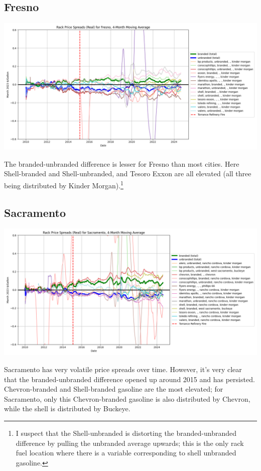 \documentclass{article}
\begin{document}
\subsection{Fresno}
\centering \includegraphics[width=5.5in]{fresno_spread.png}\\
\raggedright The branded-unbranded difference is lesser for Fresno than most cities. Here Shell-branded and Shell-unbranded, and Tesoro Exxon are all elevated (all three being distributed by Kinder Morgan).\footnote{I suspect that the Shell-unbranded is distorting the branded-unbranded difference by pulling the unbranded average upwards; this is the only rack fuel location where there is a variable corresponding to shell unbranded gasoline.}

\subsection{Sacramento} 
\centering \includegraphics[width=5.5in]{sacramento_spread.png}\\
\raggedright Sacramento has very volatile price spreads over time. However, it's very clear that the branded-unbranded difference opened up around 2015 and has persisted. Chevron-branded and Shell-branded gasoline are the most elevated; for Sacramento, only this Chevron-branded gasoline is also distributed by Chevron, while the shell is distributed by Buckeye.
\end{document}
